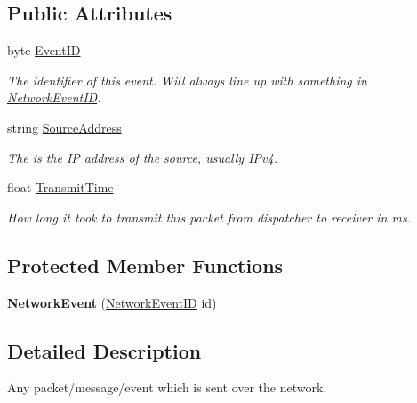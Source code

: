 \subsection*{Public Attributes}
\begin{DoxyCompactItemize}
\item 
byte \hyperlink{class_skyrates_1_1_common_1_1_network_1_1_event_1_1_network_event_ac75427f751e432fb3efe4ac0c2289a5f}{Event\-I\-D}
\begin{DoxyCompactList}\small\item\em The identifier of this event. Will always line up with something in \hyperlink{namespace_skyrates_1_1_common_1_1_network_a90fc6faa44c44b4284114e861d3e761a}{Network\-Event\-I\-D}. \end{DoxyCompactList}\item 
string \hyperlink{class_skyrates_1_1_common_1_1_network_1_1_event_1_1_network_event_a85fa6ba40f7dfa60824d5c0abc841aab}{Source\-Address}
\begin{DoxyCompactList}\small\item\em The is the I\-P address of the source, usually I\-Pv4. \end{DoxyCompactList}\item 
float \hyperlink{class_skyrates_1_1_common_1_1_network_1_1_event_1_1_network_event_abb150b5f12f022b2f2c3ff431179c69d}{Transmit\-Time}
\begin{DoxyCompactList}\small\item\em How long it took to transmit this packet from dispatcher to receiver in ms. \end{DoxyCompactList}\end{DoxyCompactItemize}
\subsection*{Protected Member Functions}
\begin{DoxyCompactItemize}
\item 
\hypertarget{class_skyrates_1_1_common_1_1_network_1_1_event_1_1_network_event_a1e7bee16c343c8e2c06d855f69662f78}{{\bfseries Network\-Event} (\hyperlink{namespace_skyrates_1_1_common_1_1_network_a90fc6faa44c44b4284114e861d3e761a}{Network\-Event\-I\-D} id)}\label{class_skyrates_1_1_common_1_1_network_1_1_event_1_1_network_event_a1e7bee16c343c8e2c06d855f69662f78}

\end{DoxyCompactItemize}


\subsection{Detailed Description}
Any packet/message/event which is sent over the network. 



